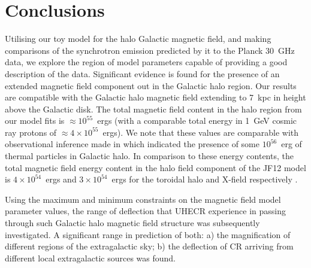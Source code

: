 \documentclass[usenatbib]{mnras}
\newcommand{\Vasu}[1]{{\color{purple}#1}}
\begin{document}
\section{Conclusions}
\label{Conclusions}

Utilising our toy model for the halo Galactic magnetic field, and making comparisons of the synchrotron emission predicted by it to the Planck 30~GHz data, we explore the region of model parameters capable of providing a good description of the data. Significant evidence is found for the presence of an extended magnetic field component out in the Galactic halo region. Our results are compatible with the Galactic halo magnetic field extending to 7~kpc in height above the Galactic disk. The total magnetic field content in the halo region from our model fits is $\approx 10^{55}$~ergs (with a comparable total energy in 1~GeV cosmic ray protons of $\approx 4\times 10^{55}$~ergs). We note that these values are comparable with observational inference made in \cite{eROSITA} which indicated the presence of some $10^{56}$~erg of thermal particles in Galactic halo.
In comparison to these energy contents, the total magnetic field energy content in the halo field component of the JF12 model is $4\times 10^{54}$~ergs and $3\times  10^{54}$~ergs for the toroidal halo and X-field respectively \cite{Taylor_2019}.

Using the maximum and minimum constraints on the magnetic field model parameter values, the range of deflection that UHECR experience in passing through such Galactic halo magnetic field structure was subsequently investigated. A significant range in prediction of both: a) the magnification of different regions of the extragalactic sky; b) the deflection of CR arriving from different local extragalactic sources was found.


\end{document}
